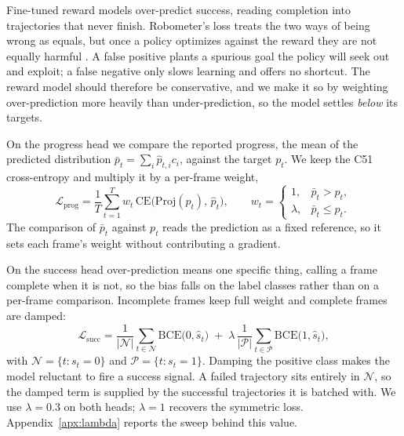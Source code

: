 Fine-tuned reward models over-predict success, reading completion into
trajectories that never finish. Robometer's loss treats the two ways of being
wrong as equals, but once a policy optimizes against the reward they are not
equally harmful \citep{gumbsch_demonstrations_2026}. A false positive plants a
spurious goal the policy will seek out and exploit; a false negative only slows
learning and offers no shortcut. The reward model should therefore be
conservative, and we make it so by weighting over-prediction more heavily than
under-prediction, so the model settles \emph{below} its targets.

On the progress head we compare the reported progress, the mean of the predicted
distribution $\bar{p}_t = \sum_i \hat{p}_{t,i} c_i$, against the target $p_t$. We
keep the C51 cross-entropy and multiply it by a per-frame weight,
\begin{equation}
\mathcal{L}_{\mathrm{prog}} = \frac{1}{T}\sum_{t=1}^{T} w_t\,
  \mathrm{CE}\!\big(\mathrm{Proj}(p_t),\, \hat{p}_t\big), \qquad
w_t = \begin{cases} 1, & \bar{p}_t > p_t,\\[2pt] \lambda, & \bar{p}_t \le p_t. \end{cases}
\label{eq:prog-asym}
\end{equation}
The comparison of $\bar{p}_t$ against $p_t$ reads the prediction as a fixed
reference, so it sets each frame's weight without contributing a gradient.

On the success head over-prediction means one specific thing, calling a frame
complete when it is not, so the bias falls on the label classes rather than on a
per-frame comparison. Incomplete frames keep full weight and complete frames are
damped:
\begin{equation}
\mathcal{L}_{\mathrm{succ}} =
  \frac{1}{|\mathcal{N}|}\sum_{t \in \mathcal{N}} \mathrm{BCE}\!\big(0, \hat{s}_t\big)
  \;+\; \lambda\,\frac{1}{|\mathcal{P}|}\sum_{t \in \mathcal{P}} \mathrm{BCE}\!\big(1, \hat{s}_t\big),
\label{eq:succ-asym}
\end{equation}
with $\mathcal{N} = \{t : s_t = 0\}$ and $\mathcal{P} = \{t : s_t = 1\}$. Damping
the positive class makes the model reluctant to fire a success signal. A failed
trajectory sits entirely in $\mathcal{N}$, so the damped term is supplied by the
successful trajectories it is batched with. We use $\lambda = 0.3$ on both heads;
$\lambda = 1$ recovers the symmetric loss. Appendix~\ref{apx:lambda} reports the
sweep behind this value.

